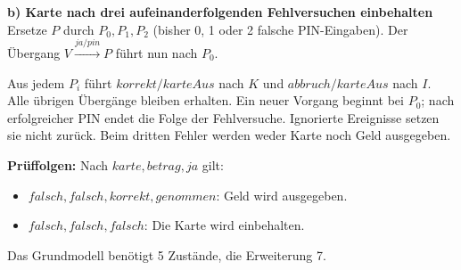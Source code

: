 \textbf{b) Karte nach drei aufeinanderfolgenden Fehlversuchen einbehalten}
Ersetze $P$ durch $P_0,P_1,P_2$ (bisher 0, 1 oder 2 falsche PIN-Eingaben). Der Übergang $V\xrightarrow{ja/pin}P$ führt nun nach $P_0$.
\begin{center}
\end{center}
Aus jedem $P_i$ führt $korrekt/karteAus$ nach $K$ und $abbruch/karteAus$ nach $I$. Alle übrigen Übergänge bleiben erhalten. Ein neuer Vorgang beginnt bei $P_0$; nach erfolgreicher PIN endet die Folge der Fehlversuche. Ignorierte Ereignisse setzen sie nicht zurück. Beim dritten Fehler werden weder Karte noch Geld ausgegeben.

\textbf{Prüffolgen:} Nach \(karte,betrag,ja\) gilt:
\begin{itemize}
\item \(falsch,falsch,korrekt,genommen\): Geld wird ausgegeben.
\item \(falsch,falsch,falsch\): Die Karte wird einbehalten.
\end{itemize}
Das Grundmodell benötigt 5 Zustände, die Erweiterung 7.

